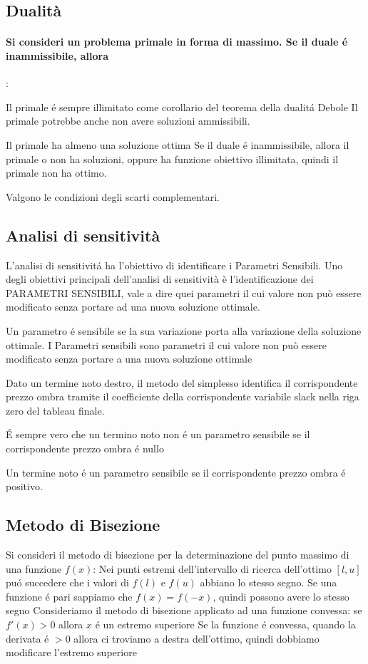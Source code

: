 \documentclass[12pt, a4paper, openany]{book}
\begin{document}
\subsection{Dualità}
\paragraph{Si consideri un problema primale in forma di massimo. Se il duale é inammissibile, allora}:

\affermazionefalse
{Il primale é sempre illimitato come corollario del teorema della dualitá Debole}
{Il primale potrebbe anche non avere soluzioni ammissibili.}

\affermazionefalse
{Il primale ha almeno una soluzione ottima}
{Se il duale é inammissibile, allora il primale o non ha soluzioni, oppure ha funzione obiettivo illimitata, quindi il primale non ha ottimo.}

\affermazione
{Valgono le condizioni degli scarti complementari.}

\subsection{Analisi di sensitività}

\affermazionetrue
{L'analisi di sensitivitá ha l'obiettivo di identificare i Parametri Sensibili.}
{Uno degli obiettivi principali dell'analisi di sensitività è l'identificazione dei PARAMETRI SENSIBILI, vale
a dire quei parametri il cui valore non può essere modificato senza portare ad una nuova soluzione
ottimale.}

\affermazionetrue
{Un parametro é sensibile se la sua variazione porta alla variazione della soluzione ottimale.}
{I Parametri sensibili sono parametri il cui valore non può essere modificato senza portare a una nuova soluzione ottimale}

\affermazionetrue
{Dato un termine noto destro, il metodo del simplesso identifica il corrispondente prezzo ombra tramite il coefficiente
della corrispondente variabile slack nella riga zero del tableau finale.}
{}

\affermazione
{É sempre vero che un termino noto non é un parametro sensibile se il corrispondente prezzo ombra é nullo}

\affermazione
{Un termine noto é un parametro sensibile se il corrispondente prezzo ombra é positivo.}

\subsection{Metodo di Bisezione}
\affermazionetrue
{
    Si consideri il metodo di bisezione per la determinazione del punto massimo di una funzione $f(x)$: Nei punti estremi dell'intervallo
    di ricerca dell'ottimo $[l,u]$ puó succedere che i valori di $f(l)$ e $f(u)$ abbiano lo stesso segno.
}
{
    Se una funzione é pari sappiamo che $f(x)=f(-x)$, quindi possono avere lo stesso segno
}
\affermazionetrue
{Consideriamo il metodo di bisezione applicato ad una funzione convessa: se $f'(x)>0$ allora $x$ é un estremo superiore}
{Se la funzione é convessa, quando la derivata é $>0$ allora ci troviamo a destra dell'ottimo, quindi dobbiamo modificare l'estremo superiore}
\end{document}
